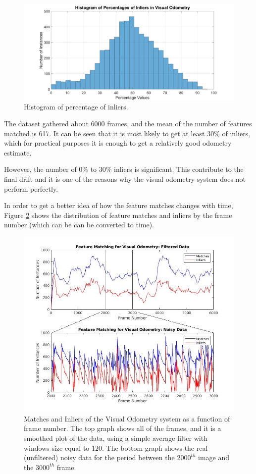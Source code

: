 \documentclass[11pt]{article}
\begin{document}
\begin{figure}[h]
	\includegraphics[width=\linewidth]{VisualOdometry/PercentageHistogram}
	\caption{Histogram of percentage of inliers.}
	\label{fig:PorcentageInliers}
\end{figure}

The dataset gathered about 6000 frames, and the mean of the number of features matched is 617. It can be seen that it is most likely to get at least 30\% of inliers, which for practical purposes it is enough to get a relatively good odometry estimate.

However, the number of 0\% to 30\% inliers is significant. This contribute to the final drift and it is one of the reasons why the visual odometry system does not perform perfectly.

In order to get a better idea of how the feature matches changes with time, Figure \ref{fig:InliersandOutliersVO} shows the distribution of feature matches and inliers by the frame number (which can be can be converted to time). 

\begin{figure}[h]
	\includegraphics[width=\linewidth]{VisualOdometry/InliertoMatches}
	\caption{Matches and Inliers of the Visual Odometry system as a function of frame number. The top graph shows all of the frames, and it is a smoothed plot of the data, using a simple average filter with windows size equal to 120.  The bottom graph shows the real (unfiltered) noisy data for the period between the $2000^{th}$ image and the $3000^{th}$ frame.}
	\label{fig:InliersandOutliersVO}
\end{figure}
\end{document}
